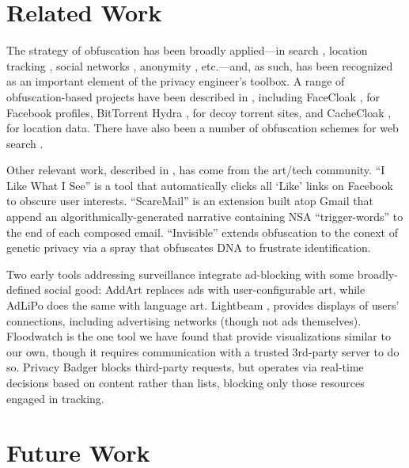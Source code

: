 \documentclass[conference]{IEEEtran}
\begin{document}



\section{Related Work}

The strategy of obfuscation has been broadly applied---in search \cite{Howe-1}, location tracking \cite{Meyerowitz}, social networks \cite{Luo}, anonymity \cite{Chakravarty, Schulze}, etc.---and, as such, has been recognized as an important element of the privacy engineer's toolbox. A range of obfuscation-based projects have been described in \cite{Brunton}, including FaceCloak \cite{Luo}, for Facebook profiles, BitTorrent Hydra \cite{Schulze}, for decoy torrent sites, and CacheCloak \cite{Meyerowitz}, for location data. There have also been a number of obfuscation schemes for web search \cite{Balsa}.

Other relevant work, described in \cite{Howe-3}, has come from the art/tech community. “I Like What I See” is a tool  that automatically clicks all ‘Like’ links on Facebook to obscure user interests. “ScareMail” \cite{Grosser} is an extension built atop Gmail that append an algorithmically-generated narrative containing NSA “trigger-words” to the end of each composed email. “Invisible”\cite{Hagborg} extends obfuscation to the conext of genetic privacy via a spray that obfuscates DNA to frustrate identification.

Two early tools addressing surveillance integrate ad-blocking with some broadly-defined social good: AddArt \cite{AddArt} replaces ads with user-configurable art, while AdLiPo \cite{Howe-0} does the same with language art. Lightbeam \cite{Mozilla}, provides displays of users' connections, including advertising networks (though not ads themselves). Floodwatch \cite{Floodwatch} is the one tool we have found that provide visualizations similar to our own, though it requires communication with a trusted 3rd-party server to do so. Privacy Badger \cite{EFF-0} blocks third-party requests, but operates via real-time decisions based on content rather than lists, blocking only those resources engaged in tracking.

\section{Future Work}
\end{document}
